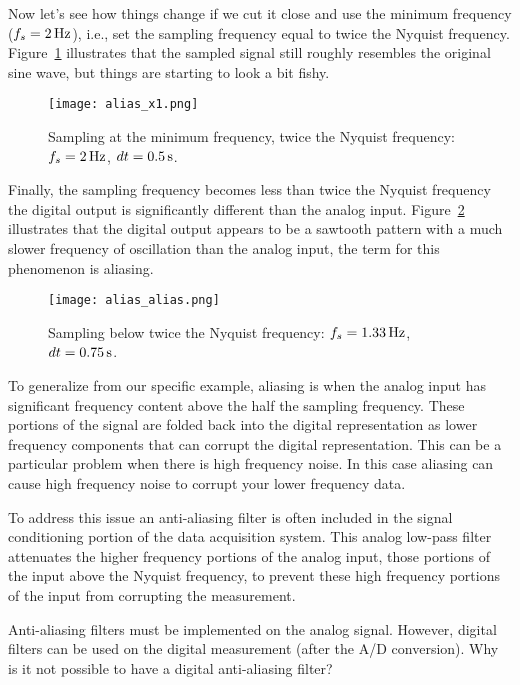 Now let's see how things change if we cut it close and use the minimum frequency ($f_s=\unit[2]{Hz}$), i.e., set the sampling frequency equal to twice the Nyquist frequency. Figure~\ref{f:alias_x1} illustrates that the sampled signal still roughly resembles the original sine wave, but things are starting to look a bit fishy.   
\begin{figure}[hbt!]
\centering
\texttt{[image: alias\_x1.png]}
\caption{Sampling at the minimum frequency, twice the Nyquist frequency: $f_s=\unit[2]{Hz}$, $dt=\unit[0.5]{s}$.}
\label{f:alias_x1}
\end{figure}

Finally, the sampling frequency becomes less than twice the Nyquist frequency the digital output is significantly different than the analog input.  Figure~\ref{f:alias_alias} illustrates that the digital output appears to be a sawtooth pattern with a much slower frequency of oscillation than the analog input, the term for this phenomenon is \gls{aliasing}.
\begin{figure}[hbt!]
\centering
\texttt{[image: alias\_alias.png]}
\caption{Sampling below twice the Nyquist frequency: $f_s=\unit[1.33]{Hz}$, $dt=\unit[0.75]{s}$.}
\label{f:alias_alias}
\end{figure}

To generalize from our specific example, aliasing is when the analog input has significant frequency content above the half the sampling frequency.  These portions of the signal are folded back into the digital representation as lower frequency components that can corrupt the digital representation.  This can be a particular problem when there is high frequency noise.  In this case aliasing can cause high frequency noise to corrupt your lower frequency data.

To address this issue an anti-aliasing filter is often included in the signal conditioning portion of the data acquisition system.  This analog low-pass filter attenuates the higher frequency portions of the analog input, those portions of the input above the Nyquist frequency, to prevent these high frequency portions of the input from corrupting the measurement.

\begin{ex}
Anti-aliasing filters must be implemented on the analog signal.  However, digital filters can be used on the digital measurement (after the A/D conversion).  Why is it not possible to have a digital anti-aliasing filter?
\end{ex}



